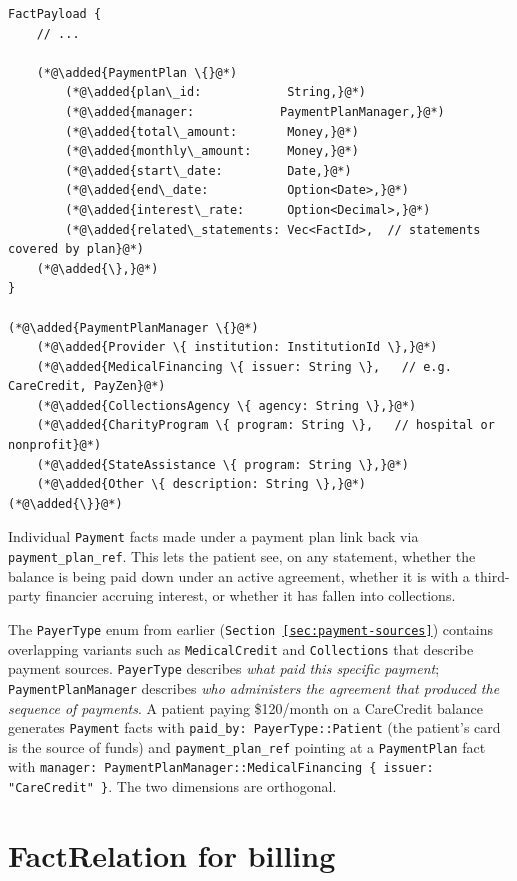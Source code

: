 \documentclass[11pt]{article}
\newcommand{\added}[1]{\textcolor{accentblue}{#1}}
\begin{document}
\begin{lstlisting}
FactPayload {
    // ...

    (*@\added{PaymentPlan \{}@*)
        (*@\added{plan\_id:            String,}@*)
        (*@\added{manager:            PaymentPlanManager,}@*)
        (*@\added{total\_amount:       Money,}@*)
        (*@\added{monthly\_amount:     Money,}@*)
        (*@\added{start\_date:         Date,}@*)
        (*@\added{end\_date:           Option<Date>,}@*)
        (*@\added{interest\_rate:      Option<Decimal>,}@*)
        (*@\added{related\_statements: Vec<FactId>,  // statements covered by plan}@*)
    (*@\added{\},}@*)
}

(*@\added{PaymentPlanManager \{}@*)
    (*@\added{Provider \{ institution: InstitutionId \},}@*)
    (*@\added{MedicalFinancing \{ issuer: String \},   // e.g. CareCredit, PayZen}@*)
    (*@\added{CollectionsAgency \{ agency: String \},}@*)
    (*@\added{CharityProgram \{ program: String \},   // hospital or nonprofit}@*)
    (*@\added{StateAssistance \{ program: String \},}@*)
    (*@\added{Other \{ description: String \},}@*)
(*@\added{\}}@*)
\end{lstlisting}

Individual \texttt{Payment} facts made under a payment plan link back
via \texttt{payment\_plan\_ref}. This lets the patient see, on any
statement, whether the balance is being paid down under an active
agreement, whether it is with a third-party financier accruing interest,
or whether it has fallen into collections.

The \texttt{PayerType} enum from earlier
(\texttt{Section~\ref{sec:payment-sources}}) contains overlapping
variants such as \texttt{MedicalCredit} and \texttt{Collections} that
describe payment sources. \texttt{PayerType} describes \emph{what paid
this specific payment}; \texttt{PaymentPlanManager} describes
\emph{who administers the agreement that produced the sequence of
payments}. A patient paying \$120/month on a CareCredit balance
generates \texttt{Payment} facts with
\texttt{paid\_by: PayerType::Patient} (the patient's card is the
source of funds) and
\texttt{payment\_plan\_ref} pointing at a \texttt{PaymentPlan} fact
with \texttt{manager: PaymentPlanManager::MedicalFinancing \{ issuer: "CareCredit" \}}.
The two dimensions are orthogonal.

\section{FactRelation for billing}
\label{sec:fact-relation}
\end{document}

